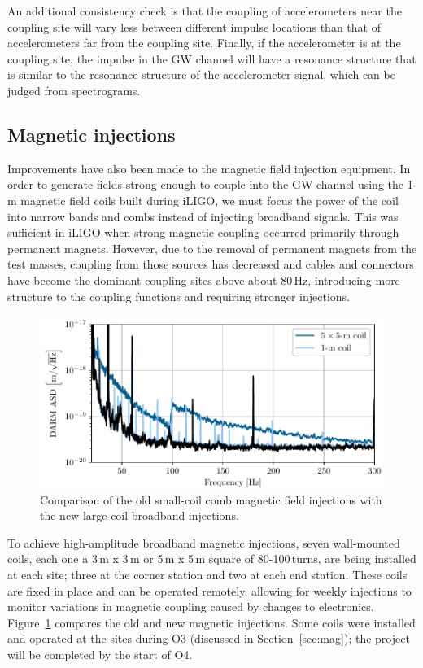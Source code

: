 An additional consistency check is that the coupling of accelerometers near the coupling site will vary less between different impulse locations than that of accelerometers far from the coupling site.
Finally, if the accelerometer is at the coupling site, the impulse in the \ac{GW} channel will have a resonance structure that is similar to the resonance structure of the accelerometer signal, which can be judged from spectrograms.


\subsection{Magnetic injections}\label{sec:injections-magnetic}

Improvements have also been made to the magnetic field injection equipment. In order to generate fields strong enough to couple into the \ac{GW} channel using the 1-m magnetic field coils built during \ac{iLIGO}, we must focus the power of the coil into narrow bands and combs instead of injecting broadband signals. This was sufficient in \ac{iLIGO} when strong magnetic coupling occurred primarily through permanent magnets. However, due to the removal of permanent magnets from the test masses, coupling from those sources has decreased and cables and connectors have become the dominant coupling sites above about 80\,Hz, introducing more structure to the coupling functions and requiring stronger injections.

\begin{figure}[h!]
	\centering
	\includegraphics{figures/noise-methods/injection-wallcoil.pdf}
	\caption{
		Comparison of the old small-coil comb magnetic field injections with the new large-coil broadband injections.}
	\label{fig:injection-wallcoil}
\end{figure}

To achieve high-amplitude broadband magnetic injections, seven wall-mounted coils, each one a 3\,m x 3\,m or 5\,m x 5\,m square of 80-100\,turns, are being installed at each site; three at the corner station and two at each end station. These coils are fixed in place and can be operated remotely, allowing for weekly injections to monitor variations in magnetic coupling caused by changes to electronics.
Figure~\ref{fig:injection-wallcoil} compares the old and new magnetic injections. Some coils were installed and operated at the sites during O3 (discussed in Section~\ref{sec:mag}); the project will be completed by the start of O4.




